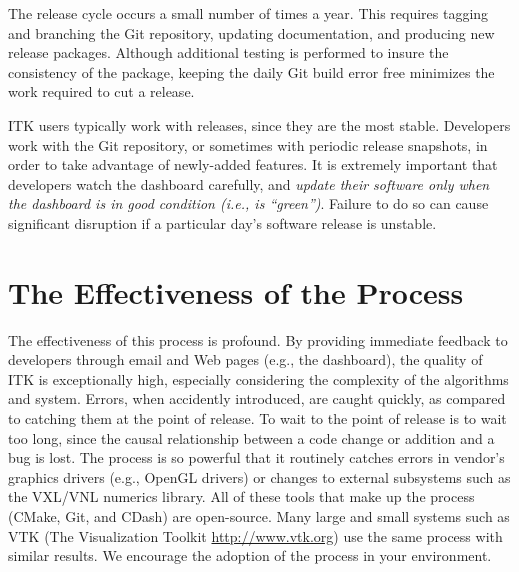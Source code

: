 The release cycle occurs a small number of times a year. This requires
tagging and branching the Git repository, updating documentation, and
producing new release packages. Although additional testing is performed to
insure the consistency of the package, keeping the daily Git build error free
minimizes the work required to cut a release.

ITK users typically work with releases, since they are the most
stable. Developers work with the Git repository, or sometimes with periodic
release snapshots, in order to take advantage of newly-added features. It is
extremely important that developers watch the dashboard carefully, and
\emph{update their software only when the dashboard is in good condition
(i.e., is ``green'')}. Failure to do so can cause significant disruption if a
particular day's software release is unstable.

\section{The Effectiveness of the Process}
\label{sec:Effectiveness}

The effectiveness of this process is profound. By providing immediate
feedback to developers through email and Web pages (e.g., the dashboard), the
quality of ITK is exceptionally high, especially considering the complexity
of the algorithms and system. Errors, when accidently introduced, are caught
quickly, as compared to catching them at the point of release. To wait to the
point of release is to wait too long, since the causal relationship between a
code change or addition and a bug is lost. The process is so powerful that it
routinely catches errors in vendor's graphics drivers (e.g., OpenGL drivers)
or changes to external subsystems such as the VXL/VNL numerics library. All
of these tools that make up the process (CMake, Git, and CDash) are
open-source. Many large and small systems such as VTK (The Visualization
Toolkit \url{http://www.vtk.org}) use the same process with similar
results. We encourage the adoption of the process in your environment.

